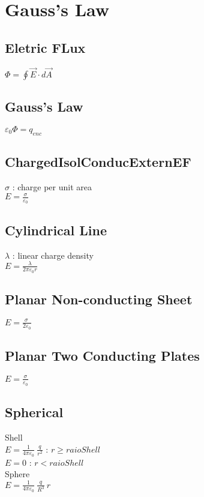 \section*{Gauss's Law}
\subsection*{Eletric FLux}
$\Phi =\oint \vec{E}\cdot d\vec{A}$\\
\subsection*{Gauss's Law}
$\varepsilon _0\Phi =q_{enc}$\\
\subsection*{ChargedIsolConducExternEF}
$\sigma$ : charge per unit area\\
$E=\frac{\sigma }{\varepsilon _0}$\\
\subsection*{Cylindrical Line}
$\lambda$ : linear charge density\\
$E=\frac{\lambda }{2\pi \varepsilon _0r}$\\
\subsection*{Planar Non-conducting Sheet}
$E=\frac{\sigma \:}{2\varepsilon _0}$\\
\subsection*{Planar Two Conducting Plates}
$E=\frac{\sigma }{\varepsilon _0}$\\
\subsection*{Spherical}
Shell\\
$E=\frac{1}{4\pi \varepsilon _0}\:\frac{q}{r^2}$ : $r\ge raioShell$\\
$E=0$ : $r < raioShell$\\
Sphere\\
$E=\frac{1}{4\pi \varepsilon _0}\:\frac{q}{R^3}\:r$\\
